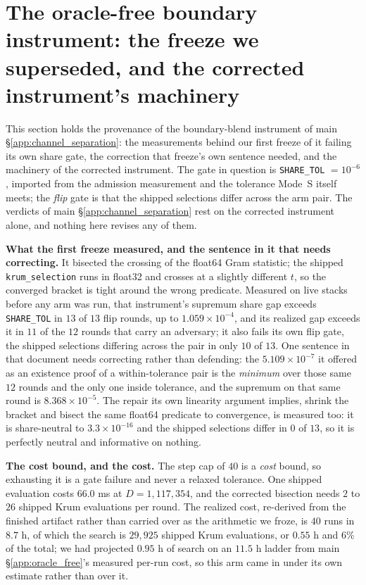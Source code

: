 \documentclass{article}
\begin{document}
\section{The oracle-free boundary instrument: the freeze we superseded, and the corrected instrument's machinery}
\label{app:blend_provenance}

\noindent This section holds the provenance of the boundary-blend instrument of main
§\ref{app:channel_separation}: the measurements behind our first freeze of it failing its own share gate,
the correction that freeze's own sentence needed, and the machinery of the corrected instrument. The gate
in question is \texttt{SHARE\_TOL} $=10^{-6}$, imported from the admission measurement and the tolerance
Mode~S itself meets; the \emph{flip} gate is that the shipped selections differ across the arm pair. The
verdicts of main §\ref{app:channel_separation} rest on the corrected instrument alone, and nothing here
revises any of them.

\textbf{What the first freeze measured, and the sentence in it that needs correcting.} It bisected the
crossing of the float64 Gram statistic; the shipped \texttt{krum\_selection} runs in float32 and crosses at
a slightly different $t$, so the converged bracket is tight around the wrong predicate. Measured on live
stacks before any arm was run, that instrument's supremum share gap exceeds \texttt{SHARE\_TOL} in $13$ of
$13$ flip rounds, up to $1.059{\times}10^{-4}$, and its realized gap exceeds it in $11$ of the $12$ rounds
that carry an adversary; it also fails its own flip gate, the shipped selections differing across the pair
in only $10$ of $13$. One sentence in that document needs correcting rather than defending: the
$5.109{\times}10^{-7}$ it offered as an existence proof of a within-tolerance pair is the \emph{minimum}
over those same $12$ rounds and the only one inside tolerance, and the supremum on that same round is
$8.368{\times}10^{-5}$. The repair its own linearity argument implies, shrink the bracket and bisect the
same float64 predicate to convergence, is measured too: it is share-neutral to $3.3{\times}10^{-16}$ and
the shipped selections differ in $0$ of $13$, so it is perfectly neutral and informative on nothing.

\textbf{The cost bound, and the cost.} The step cap of $40$ is a \emph{cost} bound, so exhausting it is a
gate failure and never a relaxed tolerance. One shipped evaluation costs $66.0$ ms at
$D = 1{,}117{,}354$, and the corrected bisection needs $2$ to $26$ shipped Krum evaluations per round. The
realized cost, re-derived from the finished artifact rather than carried over as the arithmetic we froze,
is $40$ runs in $8.7$ h, of which the search is $29{,}925$ shipped Krum evaluations, or $0.55$ h and $6\%$
of the total; we had projected $0.95$ h of search on an $11.5$ h ladder from main
§\ref{app:oracle_free}'s measured per-run cost, so this arm came in under its own estimate rather than
over it.
\end{document}
